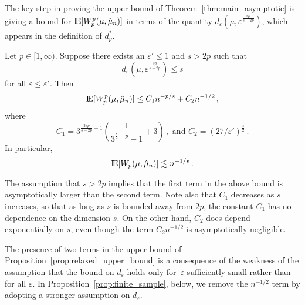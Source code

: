 \documentclass[sts]{imsart}
\newcommand*{\ep}{\varepsilon}
\begin{document}
The key step in proving the upper bound of Theorem~\ref{thm:main_asymptotic} is giving a bound for ${\rm I}\kern-0.18em{\rm E}[W_p^p(\mu, \hat \mu_n)]$ in terms of the quantity $d_\ep(\mu, \ep^{\frac{sp}{s - 2p}})$, which appears in the definition of $d_p^*$.
\begin{proposition}\label{prop:relaxed_upper_bound}
Let $p \in [1, \infty)$.
Suppose there exists an $\ep' \leq 1$ and $s > 2p$ such that
\begin{equation*}
d_{\ep}(\mu, \ep^{\frac{sp}{s - 2p}}) \leq s
\end{equation*}
for all $\ep \leq \ep'$. Then
\begin{equation*}
{\rm I}\kern-0.18em{\rm E}[W_p^p(\mu, \hat \mu_n)] \leq C_1 n^{-p/s} + C_2 n^{-1/2}\,,
\end{equation*}
where
\begin{equation*}
C_1 = 3^{\frac{3sp}{s - 2p}+1}\left(\frac{1}{3^{\frac s 2 - p} - 1} + 3\right)\,, \text{ and } C_2  = (27/\ep')^{\frac s 2}\,.
\end{equation*}
In particular,
\begin{equation*}
{\rm I}\kern-0.18em{\rm E}[W_p(\mu, \hat \mu_n)]  \lesssim n^{-1/s}\,.
\end{equation*}
\end{proposition}
The assumption that $s > 2p$ implies that the first term in the above bound is asymptotically larger than the second term.
Note also that $C_1$ decreases as $s$ increases, so that as long as $s$ is bounded away from $2p$, the constant $C_1$ has no dependence on the dimension $s$.
On the other hand, $C_2$ does depend exponentially on $s$, even though the term $C_2 n^{-1/2}$ is asymptotically negligible.

The presence of two terms in the upper bound of Proposition~\ref{prop:relaxed_upper_bound} is a consequence of the weakness of the assumption that the bound on $d_\ep$ holds only for~$\ep$ sufficiently small rather than for all $\ep$.
In Proposition~\ref{prop:finite_sample}, below, we remove the $n^{-1/2}$ term by adopting a stronger assumption on $d_\ep$.
\end{document}
